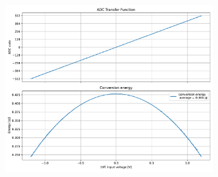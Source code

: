 \documentclass[varwidth]{standalone}
\begin{document}
\begin{figure}
\begin{subfigure}{0.32\textwidth}
    \includegraphics[width=\textwidth]{behavioral_10b_refnoise_energy.pdf}
\end{subfigure}
\end{figure}
\end{document}
